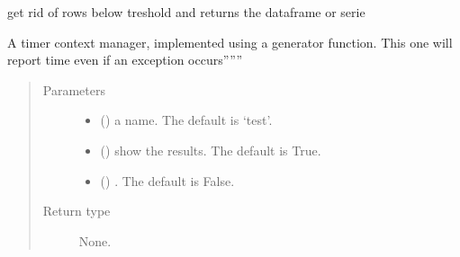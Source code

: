 \documentclass[letterpaper,10pt,english]{sphinxmanual}
\begin{document}
\begin{fulllineitems}
\label{\detokenize{unsorted/modelhelp:modelhelp.cutout}}
\pysigstartsignatures
{}
\pysigstopsignatures
\sphinxAtStartPar
get rid of rows below treshold and returns the dataframe or serie

\end{fulllineitems}


\begin{fulllineitems}
\label{\detokenize{unsorted/modelhelp:modelhelp.ttimer}}
\pysigstartsignatures
{}
\pysigstopsignatures
\sphinxAtStartPar
A timer context manager, implemented using a
generator function. This one will report time even if an exception occurs”””
\begin{quote}\begin{description}
\item[{Parameters}] \leavevmode\begin{itemize}
\item {} 
\sphinxAtStartPar
{} (\sphinxstyleliteralemphasis{\sphinxupquote{, }}) \textendash{} a name. The default is ‘test’.

\item {} 
\sphinxAtStartPar
{} (\sphinxstyleliteralemphasis{\sphinxupquote{, }}) \textendash{} show the results. The default is True.

\item {} 
\sphinxAtStartPar
{} (\sphinxstyleliteralemphasis{\sphinxupquote{, }}) \textendash{} . The default is False.

\end{itemize}

\item[{Return type}] \leavevmode
\sphinxAtStartPar
None.

\end{description}\end{quote}

\end{fulllineitems}
\end{document}
